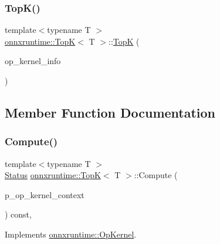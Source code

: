 \subsubsection{\texorpdfstring{Top\+K()}{TopK()}}
{\footnotesize\ttfamily template$<$typename T $>$ \\
\mbox{\hyperlink{classonnxruntime_1_1TopK}{onnxruntime\+::\+TopK}}$<$ T $>$\+::\mbox{\hyperlink{classonnxruntime_1_1TopK}{TopK}} (\begin{DoxyParamCaption}\item[{const \mbox{\hyperlink{classonnxruntime_1_1OpKernelInfo}{Op\+Kernel\+Info}} \&}]{op\+\_\+kernel\+\_\+info }\end{DoxyParamCaption})\hspace{0.3cm}{\ttfamily [inline]}}



\subsection{Member Function Documentation}
\mbox{\label{classonnxruntime_1_1TopK_a0acd7025a833f51d22a0bc5ad6ec6c48}} 
\subsubsection{\texorpdfstring{Compute()}{Compute()}\hspace{0.1cm}{\footnotesize\ttfamily [1/2]}}
{\footnotesize\ttfamily template$<$typename T $>$ \\
\mbox{\hyperlink{classonnxruntime_1_1common_1_1Status}{Status}} \mbox{\hyperlink{classonnxruntime_1_1TopK}{onnxruntime\+::\+TopK}}$<$ T $>$\+::Compute (\begin{DoxyParamCaption}\item[{\mbox{\hyperlink{classonnxruntime_1_1OpKernelContext}{Op\+Kernel\+Context}} $\ast$}]{p\+\_\+op\+\_\+kernel\+\_\+context }\end{DoxyParamCaption}) const\hspace{0.3cm}{\ttfamily [override]}, {\ttfamily [virtual]}}



Implements \mbox{\hyperlink{classonnxruntime_1_1OpKernel_a9eca8656a78b1b3ab9d3351a12798650}{onnxruntime\+::\+Op\+Kernel}}.

\mbox{\label{classonnxruntime_1_1TopK_ab26bb94db8038c225e7efc2339fc4bfd}} 
